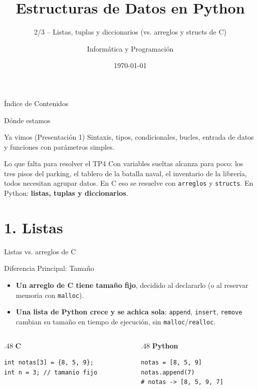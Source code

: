 \documentclass{beamer}
\title[Python desde C -- 2/3]{Estructuras de Datos en Python}
\subtitle{2/3 -- Listas, tuplas y diccionarios (vs. arreglos y structs de C)}
\author{Informática y Programación}
\date{\today}
\institute{UNCuyo -- Facultad de Ingeniería}
\begin{document}
\begin{frame}
  \titlepage
\end{frame}

\begin{frame}{Índice de Contenidos}
  \tableofcontents
\end{frame}

\begin{frame}{Dónde estamos}
  \begin{block}{Ya vimos (Presentación 1)}
    Sintaxis, tipos, condicionales, bucles, entrada de datos y funciones
    con parámetros simples.
  \end{block}
  \begin{alertblock}{Lo que falta para resolver el TP4}
    Con variables sueltas alcanza para poco: los tres pisos del parking,
    el tablero de la batalla naval, el inventario de la librería, todos
    necesitan agrupar datos. En C eso se resuelve con \texttt{arreglos} y
    \texttt{structs}. En Python: \textbf{listas, tuplas y diccionarios}.
  \end{alertblock}
\end{frame}

\section{1. Listas}

\begin{frame}[fragile]{Listas vs. arreglos de C}
  \begin{block}{Diferencia Principal: Tamaño}
    \begin{itemize}
      \item \textbf{Un arreglo de C tiene tamaño fijo}, decidido al declararlo (o al reservar memoria con \texttt{malloc}).
      \item \textbf{Una lista de Python crece y se achica sola}: \texttt{append}, \texttt{insert}, \texttt{remove} cambian su tamaño en tiempo de ejecución, sin \texttt{malloc}/\texttt{realloc}.
    \end{itemize}
  \end{block}
  \begin{columns}[T]
    \begin{column}{.48\textwidth}
      \centering\textbf{C}
      \begin{verbatim}
int notas[3] = {8, 5, 9};
int n = 3; // tamanio fijo
      \end{verbatim}
    \end{column}
    \begin{column}{.48\textwidth}
      \centering\textbf{Python}
      \begin{verbatim}
notas = [8, 5, 9]
notas.append(7)
# notas -> [8, 5, 9, 7]
      \end{verbatim}
    \end{column}
  \end{columns}
\end{frame}
\end{document}
